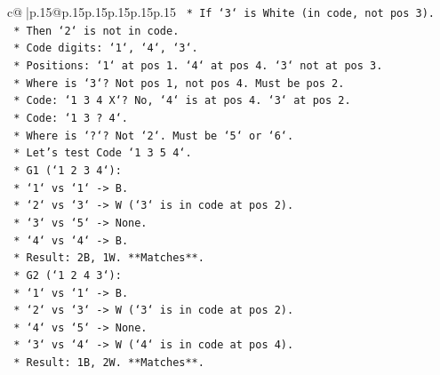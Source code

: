 \documentclass{article}
\begin{document}
{\begin{supertabular}{c@{$\;$}|p{.15\linewidth}@{}p{.15\linewidth}p{.15\linewidth}p{.15\linewidth}p{.15\linewidth}p{.15\linewidth}}
{{{\texttt{                                    *   If `3` is White (in code, not pos 3).} \\
\texttt{                                    *   Then `2` is not in code.} \\
\texttt{                                    *   Code digits: `1`, `4`, `3`.} \\
\texttt{                                    *   Positions: `1` at pos 1. `4` at pos 4. `3` not at pos 3.} \\
\texttt{                                    *   Where is `3`? Not pos 1, not pos 4. Must be pos 2.} \\
\texttt{                                    *   Code: `1 3 4 X`? No, `4` is at pos 4. `3` at pos 2.} \\
\texttt{                                    *   Code: `1 3 ? 4`.} \\
\texttt{                                    *   Where is `?`? Not `2`. Must be `5` or `6`.} \\
\texttt{                                    *   Let's test Code `1 3 5 4`.} \\
\texttt{                                        *   G1 (`1 2 3 4`):} \\
\texttt{                                            *   `1` vs `1` {-}> B.} \\
\texttt{                                            *   `2` vs `3` {-}> W (`3` is in code at pos 2).} \\
\texttt{                                            *   `3` vs `5` {-}> None.} \\
\texttt{                                            *   `4` vs `4` {-}> B.} \\
\texttt{                                            *   Result: 2B, 1W. **Matches**.} \\
\texttt{                                        *   G2 (`1 2 4 3`):} \\
\texttt{                                            *   `1` vs `1` {-}> B.} \\
\texttt{                                            *   `2` vs `3` {-}> W (`3` is in code at pos 2).} \\
\texttt{                                            *   `4` vs `5` {-}> None.} \\
\texttt{                                            *   `3` vs `4` {-}> W (`4` is in code at pos 4).} \\
\texttt{                                            *   Result: 1B, 2W. **Matches**.} \\
}}}
\end{supertabular}}
\end{document}
